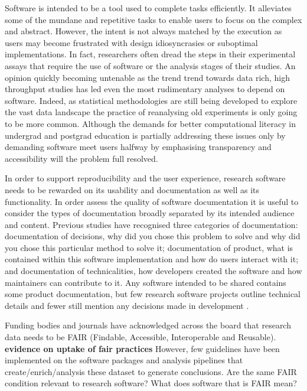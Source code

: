 \documentclass{SBCbookchapter}
\begin{document}
Software is intended to be a tool used to complete tasks efficiently.
It alleviates some of the mundane and repetitive tasks to enable users to focus on the complex and abstract. 
However, the intent is not always matched by the execution as users may become frustrated with design idiosyncrasies or suboptimal implementations.
In fact, researchers often dread the steps in their experimental assays that require the use of software or the analysis stages of their studies.
An opinion quickly becoming untenable as the trend trend towards data rich, high throughput studies has led even the most rudimentary analyses to depend on software.
Indeed, as statistical methodologies are still being developed to explore the vast data landscape the practice of reanalysing old experiments is only going to be more common. 
Although the demands for better computational literacy in undergrad and postgrad education is partially addressing these issues only by demanding software meet users halfway by emphasising transparency and accessibility will the problem full resolved.

In order to support reproducibility and the user experience, research software needs to be rewarded on its usability and documentation as well as its functionality.
In order assess the quality of software documentation it is useful to consider the types of documentation broadly separated by its intended audience and content. 
Previous studies have recognised three categories of documentation: documentation of decisions, why did you chose this problem to solve and why did you chose this particular method to solve it; documentation of product, what is contained within this software implementation and how do users interact with it; and documentation of technicalities, how developers created the software and how maintainers can contribute to it. 
Any software intended to be shared contains some product documentation, but few research software projects outline technical details and fewer still mention any decisions made in development \cite{Geiger2018}.

Funding bodies and journals have acknowledged across the board that research data needs to be FAIR (Findable, Accessible, Interoperable and Reusable). \textbf{evidence on uptake of fair practices} However, few guidelines have been implemented on the software packages and analysis pipelines that create/enrich/analysis these dataset to generate conclusions. Are the same FAIR condition relevant to research software? What does software that is FAIR mean? %
\end{document}
